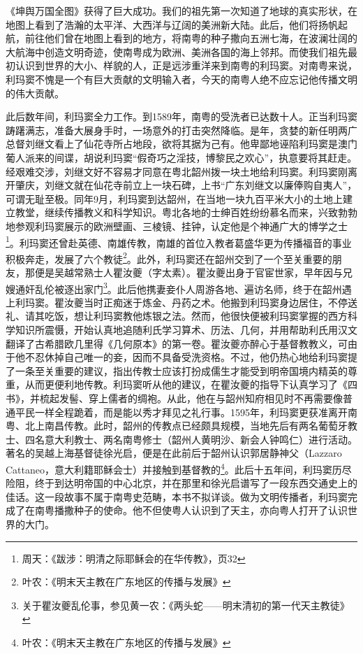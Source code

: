 《坤舆万国全图》获得了巨大成功。我们的祖先第一次知道了地球的真实形状，在地图上看到了浩瀚的太平洋、大西洋与辽阔的美洲新大陆。此后，他们将扬帆起航，前往他们曾在地图上看到的地方，将南粤的种子撒向五洲七海，在波澜壮阔的大航海中创造文明奇迹，使南粤成为欧洲、美洲各国的海上邻邦。而使我们祖先最初认识到世界的大小、样貌的人，正是远涉重洋来到南粤的利玛窦。对南粤来说，利玛窦不愧是一个有巨大贡献的文明输入者，今天的南粤人绝不应忘记他传播文明的伟大贡献。

此后数年间，利玛窦全力工作。到1589年，南粤的受洗者已达数十人。正当利玛窦踌躇满志，准备大展身手时，一场意外的打击突然降临。是年，贪婪的新任明两广总督刘继文看上了仙花寺所占地段，欲将其据为己有。他卑鄙地诬陷利玛窦是澳门葡人派来的间谍，胡说利玛窦“假奇巧之淫技，博黎民之欢心”，执意要将其赶走。经艰难交涉，刘继文好不容易才同意在粤北韶州拨一块土地给利玛窦。利玛窦刚离开肇庆，刘继文就在仙花寺前立上一块石碑，上书“广东刘继文以廉俸购自夷人”，可谓无耻至极。同年9月，利玛窦到达韶州，在当地一块九百平米大小的土地上建立教堂，继续传播教义和科学知识。粤北各地的士绅百姓纷纷慕名而来，兴致勃勃地参观利玛窦展示的欧洲壁画、三棱镜、挂钟，认定他是个神通广大的博学之士\footnote{周天：《跋涉：明清之际耶稣会的在华传教》，页32}。利玛窦还曾赴英德、南雄传教，南雄的首位入教者葛盛华更为传播福音的事业积极奔走，发展了六个教徒\footnote{叶农：《明末天主教在广东地区的传播与发展》}。此外，利玛窦还在韶州交到了一个至关重要的朋友，那便是吴越常熟士人瞿汝夔（字太素）。瞿汝夔出身于官宦世家，早年因与兄嫂通奸乱伦被逐出家门\footnote{关于瞿汝夔乱伦事，参见黄一农：《两头蛇——明末清初的第一代天主教徒》}。此后他携妻妾仆人周游各地、遍访名师，终于在韶州遇上利玛窦。瞿汝夔当时正痴迷于炼金、丹药之术。他搬到利玛窦身边居住，不停送礼、请其吃饭，想让利玛窦教他炼银之法。然而，他很快便被利玛窦掌握的西方科学知识所震慑，开始认真地追随利氏学习算术、历法、几何，并用帮助利氏用汉文翻译了古希腊欧几里得《几何原本》的第一卷。瞿汝夔亦醉心于基督教教义，可由于他不忍休掉自己唯一的妾，因而不具备受洗资格。不过，他仍热心地给利玛窦提了一条至关重要的建议，指出传教士应该打扮成儒生才能受到明帝国境内精英的尊重，从而更便利地传教。利玛窦听从他的建议，在瞿汝夔的指导下认真学习了《四书》，并梳起发髻、穿上儒者的绸袍。从此，他在与韶州知府相见时不再需要像普通平民一样全程跪着，而是能以秀才拜见之礼行事。1595年，利玛窦更获准离开南粤、北上南昌传教。此时，韶州的传教点已经颇具规模，当地先后有两名葡萄牙教士、四名意大利教士、两名南粤修士（韶州人黄明沙、新会人钟鸣仁）进行活动。著名的吴越上海基督徒徐光启，便是在此前后于韶州认识郭居静神父（Lazzaro Cattaneo，意大利籍耶稣会士）并接触到基督教的\footnote{叶农：《明末天主教在广东地区的传播与发展》}。此后十五年间，利玛窦历尽险阻，终于到达明帝国的中心北京，并在那里和徐光启谱写了一段东西交通史上的佳话。这一段故事不属于南粤史范畴，本书不拟详谈。做为文明传播者，利玛窦完成了在南粤播撒种子的使命。他不但使粤人认识到了天主，亦向粤人打开了认识世界的大门。

